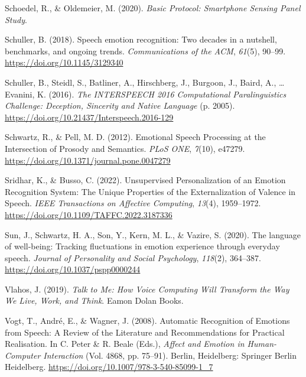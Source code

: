\documentclass[
  man,floatsintext]{apa6}
\newlength{\cslhangindent}
\newlength{\cslentryspacingunit} %
\newenvironment{CSLReferences}[2] %
 {%
  \setlength{\parindent}{0pt}
  \ifodd #1
  \let\oldpar\par
  \def\par{\hangindent=\cslhangindent\oldpar}
  \fi
  \setlength{\parskip}{#2\cslentryspacingunit}
 }%
 {}
\begin{document}
\begin{CSLReferences}{1}{0}
\leavevmode{}%
Schoedel, R., \& Oldemeier, M. (2020). \emph{Basic {Protocol}: {Smartphone Sensing Panel Study}}.

\leavevmode{}%
Schuller, B. (2018). Speech emotion recognition: Two decades in a nutshell, benchmarks, and ongoing trends. \emph{Communications of the ACM}, \emph{61}(5), 90--99. \url{https://doi.org/10.1145/3129340}

\leavevmode{}%
Schuller, B., Steidl, S., Batliner, A., Hirschberg, J., Burgoon, J., Baird, A., \ldots{} Evanini, K. (2016). \emph{The {INTERSPEECH} 2016 {Computational Paralinguistics Challenge}: {Deception}, {Sincerity} and {Native Language}} (p. 2005). \url{https://doi.org/10.21437/Interspeech.2016-129}

\leavevmode{}%
Schwartz, R., \& Pell, M. D. (2012). Emotional {Speech Processing} at the {Intersection} of {Prosody} and {Semantics}. \emph{PLoS ONE}, \emph{7}(10), e47279. \url{https://doi.org/10.1371/journal.pone.0047279}

\leavevmode{}%
Sridhar, K., \& Busso, C. (2022). Unsupervised {Personalization} of an {Emotion Recognition System}: {The Unique Properties} of the {Externalization} of {Valence} in {Speech}. \emph{IEEE Transactions on Affective Computing}, \emph{13}(4), 1959--1972. \url{https://doi.org/10.1109/TAFFC.2022.3187336}

\leavevmode{}%
Sun, J., Schwartz, H. A., Son, Y., Kern, M. L., \& Vazire, S. (2020). The language of well-being: {Tracking} fluctuations in emotion experience through everyday speech. \emph{Journal of Personality and Social Psychology}, \emph{118}(2), 364--387. \url{https://doi.org/10.1037/pspp0000244}

\leavevmode{}%
Vlahos, J. (2019). \emph{Talk to {Me}: {How Voice Computing Will Transform} the {Way We Live}, {Work}, and {Think}}. {Eamon Dolan Books}.

\leavevmode{}%
Vogt, T., André, E., \& Wagner, J. (2008). Automatic {Recognition} of {Emotions} from {Speech}: {A Review} of the {Literature} and {Recommendations} for {Practical Realisation}. In C. Peter \& R. Beale (Eds.), \emph{Affect and {Emotion} in {Human-Computer Interaction}} (Vol. 4868, pp. 75--91). {Berlin, Heidelberg}: {Springer Berlin Heidelberg}. \url{https://doi.org/10.1007/978-3-540-85099-1_7}


\end{CSLReferences}
\end{document}
